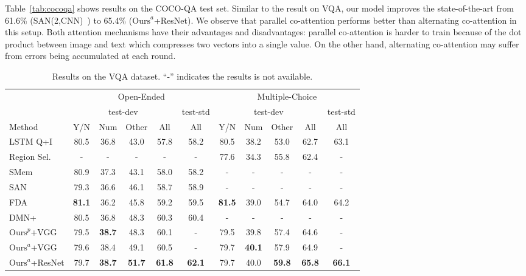 \documentclass{article}
\begin{document}
Table~\ref{tab:cocoqa} shows results on the COCO-QA test set. Similar to the result on VQA, our model improves the state-of-the-art from 61.6\% (SAN(2,CNN)~\cite{yang2015stacked}) to 65.4\% ($\textrm{Ours}^a$+ResNet). We observe that parallel co-attention performs better than alternating co-attention in this setup. Both attention mechanisms have their advantages and disadvantages: parallel co-attention is harder to train because of the dot product between image and text which compresses two vectors into a single value. On the other hand, alternating co-attention may suffer from errors being accumulated at each round. \begin{table}[t]\footnotesize
\setlength{\tabcolsep}{5.5pt}
  \caption{Results on the VQA dataset. ``-'' indicates the results is not available.}\centering
  \begin{tabular}{l c c c c c c c c c c}
    \toprule
    \multicolumn{1}{c}{} & \multicolumn{5}{c}{Open-Ended}  & \multicolumn{5}{c}{Multiple-Choice}\\
   \cmidrule(r){2-6}
   \cmidrule(r){7-11}
    \multicolumn{1}{c}{}   & \multicolumn{4}{c}{test-dev}  & \multicolumn{1}{c}{test-std}   & \multicolumn{4}{c}{test-dev}  & \multicolumn{1}{c}{test-std} \\
    \cmidrule(r){2-5}
    \cmidrule(r){6-6}    
    \cmidrule(r){7-10}
    \cmidrule(r){11-11}
    Method  & Y/N  & Num & Other & All & All & Y/N  & Num & Other & All & All\\
    \midrule	    
    LSTM Q+I \cite{antol2015vqa}& 80.5 & 36.8 & 43.0 & 57.8 & 58.2 & 80.5 & 38.2 & 53.0 & 62.7 & 63.1  \\
	Region Sel. \cite{shih2015look} & - & - & - & - & - & 77.6 & 34.3 & 55.8 & 62.4& - \\   
    SMem \cite{xu2015ask} & 80.9 &  37.3  & 43.1  & 58.0 & 58.2 & - & - & - & - & - \\
    SAN \cite{yang2015stacked}  & 79.3 &  36.6  & 46.1   &  58.7 & 58.9 & - & - & - & - & - \\
    FDA \cite{Ilievski2016}  & \textbf{81.1} &  36.2  & 45.8   &  59.2 & 59.5 & \textbf{81.5} &  39.0 & 54.7 & 64.0 & 64.2 \\
    DMN+ \cite{xiong2016dynamic} & 80.5 &  36.8 &  48.3  & 60.3  & 60.4 & - & - & - & - & - \\
    \midrule	    
    $\textrm{Ours}^p$+VGG & 79.5 & \textbf{38.7} & 48.3 & 60.1 & - & 79.5 & 39.8 & 57.4 & 64.6 &-\\
    $\textrm{Ours}^a$+VGG & 79.6 & 38.4 & 49.1 & 60.5 & - & 79.7 & \textbf{40.1} & 57.9 & 64.9 &-\\    
    $\textrm{Ours}^a$+ResNet & 79.7 &  \textbf{38.7} & \textbf{51.7} & \textbf{61.8} & \textbf{62.1} & 79.7 & 40.0 & \textbf{59.8} & \textbf{65.8} & \textbf{66.1}\\
    \bottomrule
  \end{tabular}
  \label{tab:vqa}
\end{table}  
\end{document}

